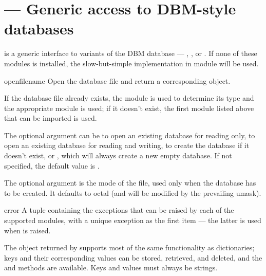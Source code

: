 \section{ ---
         Generic access to DBM-style databases}



 is a generic interface to variants of the DBM
database --- ,
, or .
If none of these modules is installed, the slow-but-simple
implementation in module  will
be used.

\begin{funcdesc}{open}{filename}
Open the database file  and return a corresponding object.

If the database file already exists, the  module is
used to determine its type and the appropriate module is used; if it
doesn't exist, the first module listed above that can be imported is
used.

The optional  argument can be
 to open an existing database for reading only,
 to open an existing database for reading and writing,
 to create the database if it doesn't exist, or
, which will always create a new empty database.  If not
specified, the default value is .

The optional  argument is the \UNIX{} mode of the file, used
only when the database has to be created.  It defaults to octal
 (and will be modified by the prevailing umask).
\end{funcdesc}

\begin{excdesc}{error}
A tuple containing the exceptions that can be raised by each of the
supported modules, with a unique exception  as
the first item --- the latter is used when  is
raised.
\end{excdesc}

The object returned by  supports most of the same
functionality as dictionaries; keys and their corresponding values can
be stored, retrieved, and deleted, and the  and
 methods are available.  Keys and values must always be
strings.




